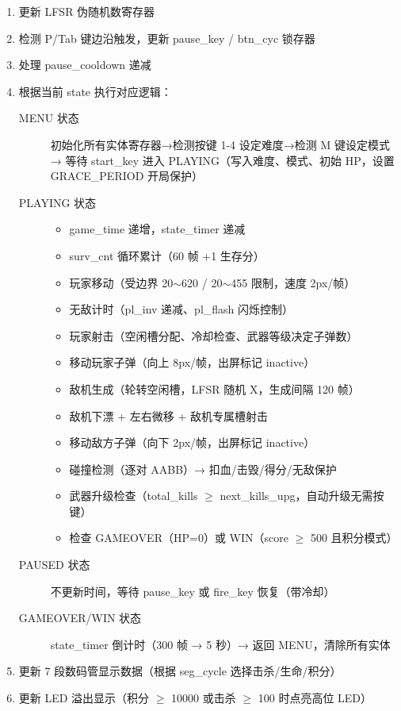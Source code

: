 \documentclass[12pt,a4paper]{ctexart}
\begin{document}
\begin{enumerate}[label=(\arabic*)]
    \item 更新 LFSR 伪随机数寄存器
    \item 检测 P/Tab 键边沿触发，更新 pause\_key / btn\_cyc 锁存器
    \item 处理 pause\_cooldown 递减
    \item 根据当前 state 执行对应逻辑：
    \begin{description}
        \item[MENU 状态] 初始化所有实体寄存器→检测按键 1-4 设定难度→检测 M 键设定模式→
        等待 start\_key 进入 PLAYING（写入难度、模式、初始 HP，设置 GRACE\_PERIOD 开局保护）
        \item[PLAYING 状态]\mbox{}
        \begin{itemize}
            \item game\_time 递增，state\_timer 递减
            \item surv\_cnt 循环累计（60 帧 +1 生存分）
            \item 玩家移动（受边界 20$\sim$620 / 20$\sim$455 限制，速度 2px/帧）
            \item 无敌计时（pl\_inv 递减、pl\_flash 闪烁控制）
            \item 玩家射击（空闲槽分配、冷却检查、武器等级决定子弹数）
            \item 移动玩家子弹（向上 8px/帧，出屏标记 inactive）
            \item 敌机生成（轮转空闲槽，LFSR 随机 X，生成间隔 120 帧）
            \item 敌机下漂 + 左右微移 + 敌机专属槽射击
            \item 移动敌方子弹（向下 2px/帧，出屏标记 inactive）
            \item 碰撞检测（逐对 AABB）→ 扣血/击毁/得分/无敌保护
            \item 武器升级检查（total\_kills $\ge$ next\_kills\_upg，自动升级无需按键）
            \item 检查 GAMEOVER（HP=0）或 WIN（score $\ge$ 500 且积分模式）
        \end{itemize}
        \item[PAUSED 状态] 不更新时间，等待 pause\_key 或 fire\_key 恢复（带冷却）
        \item[GAMEOVER/WIN 状态] state\_timer 倒计时（300 帧 → 5 秒）→ 返回 MENU，清除所有实体
    \end{description}
    \item 更新 7 段数码管显示数据（根据 seg\_cycle 选择击杀/生命/积分）
    \item 更新 LED 溢出显示（积分 $\ge$ 10000 或击杀 $\ge$ 100 时点亮高位 LED）
\end{enumerate}
\end{document}
